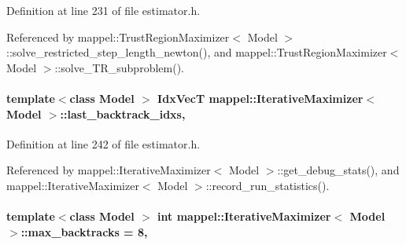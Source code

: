 Definition at line 231 of file estimator.\+h.



Referenced by mappel\+::\+Trust\+Region\+Maximizer$<$ Model $>$\+::solve\+\_\+restricted\+\_\+step\+\_\+length\+\_\+newton(), and mappel\+::\+Trust\+Region\+Maximizer$<$ Model $>$\+::solve\+\_\+\+T\+R\+\_\+subproblem().

\paragraph[{\texorpdfstring{last\+\_\+backtrack\+\_\+idxs}{last_backtrack_idxs}}]{\setlength{\rightskip}{0pt plus 5cm}template$<$class Model $>$ {\bf Idx\+VecT} {\bf mappel\+::\+Iterative\+Maximizer}$<$ Model $>$\+::last\+\_\+backtrack\+\_\+idxs\hspace{0.3cm}{\ttfamily [protected]}, {\ttfamily [inherited]}}\hypertarget{classmappel_1_1IterativeMaximizer_a80280950668483fccde55616ecc38b7b}{}\label{classmappel_1_1IterativeMaximizer_a80280950668483fccde55616ecc38b7b}


Definition at line 242 of file estimator.\+h.



Referenced by mappel\+::\+Iterative\+Maximizer$<$ Model $>$\+::get\+\_\+debug\+\_\+stats(), and mappel\+::\+Iterative\+Maximizer$<$ Model $>$\+::record\+\_\+run\+\_\+statistics().

\paragraph[{\texorpdfstring{max\+\_\+backtracks}{max_backtracks}}]{\setlength{\rightskip}{0pt plus 5cm}template$<$class Model $>$ int {\bf mappel\+::\+Iterative\+Maximizer}$<$ Model $>$\+::max\+\_\+backtracks = 8\hspace{0.3cm}{\ttfamily [protected]}, {\ttfamily [inherited]}}\hypertarget{classmappel_1_1IterativeMaximizer_a72148f311140be63ded9794921a7c112}{}\label{classmappel_1_1IterativeMaximizer_a72148f311140be63ded9794921a7c112}


